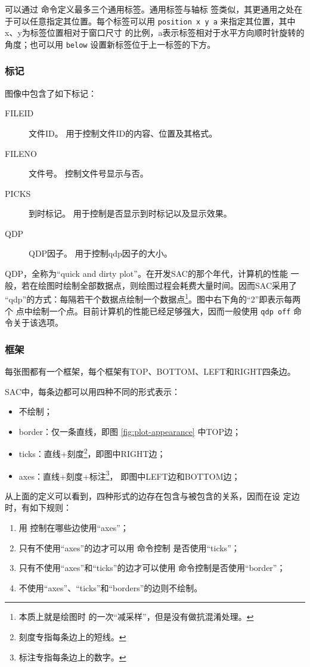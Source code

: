 可以通过  命令定义最多三个通用标签。通用标签与轴标
签类似，其更通用之处在于可以任意指定其位置。每个标签可以用
\texttt{position x y a} 来指定其位置，其中x、y为标签位置相对于窗口尺寸
的比例，a表示标签相对于水平方向顺时针旋转的角度；也可以用 \texttt{below}
设置新标签位于上一标签的下方。

\subsubsection{标记}
图像中包含了如下标记：
\begin{description}
\item [FILEID] 文件ID。 用于控制文件ID的内容、位置及其格式。
\item [FILENO] 文件号。 控制文件号显示与否。
\item [PICKS] 到时标记。 用于控制是否显示到时标记以及显示效果。
\item [QDP] QDP因子。 用于控制qdp因子的大小。
\end{description}

QDP，全称为``quick and dirty plot''。在开发SAC的那个年代，计算机的性能
一般，若在绘图时绘制全部数据点，则绘图过程会耗费大量时间。因而SAC采用了
``qdp''的方式：每隔若干个数据点绘制一个数据点\footnote{本质上就是绘图时
的一次``减采样''，但是没有做抗混淆处理。}。图中右下角的``2''即表示每两个
点中绘制一个点。目前计算机的性能已经足够强大，因而一般使用 \texttt{qdp off}
命令关于该选项。

\subsubsection{框架}
每张图都有一个框架，每个框架有TOP、BOTTOM、LEFT和RIGHT四条边。

SAC中，每条边都可以用四种不同的形式表示：
\begin{itemize}
\item 不绘制；
\item border：仅一条直线，即图 \ref{fig:plot-appearance} 中TOP边；
\item ticks：直线+刻度\footnote{刻度专指每条边上的短线。}，即图中RIGHT边；
\item axes：直线+刻度+标注\footnote{标注专指每条边上的数字。}，
    即图中LEFT边和BOTTOM边；
\end{itemize}

从上面的定义可以看到，四种形式的边存在包含与被包含的关系，因而在设
定边时，有如下规则：
\begin{enumerate}
\item 用  控制在哪些边使用``axes''；
\item 只有不使用``axes''的边才可以用  命令控制
    是否使用``ticks''；
\item 只有不使用``axes''和``ticks''的边才可以使用 
    命令控制是否使用``border''；
\item 不使用``axes''、``ticks''和``borders''的边则不绘制。
\end{enumerate}

